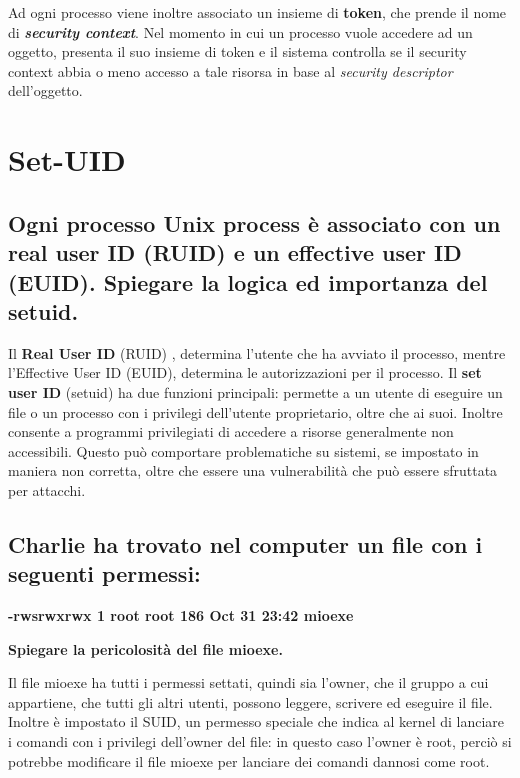 \documentclass{report}
\begin{document}
\noindent Ad ogni processo viene inoltre associato un insieme di \textbf{token}, che prende il nome di 
\textbf{\textit{security context}}. Nel momento in cui un processo vuole accedere ad un oggetto, presenta 
il suo insieme di token e il sistema controlla se il security context abbia o meno accesso a tale risorsa 
in base al \textit{security descriptor} dell'oggetto.



\chapter{Set-UID}
\section{}


\section{Ogni processo Unix process è associato con un real user ID (RUID) e un effective user ID (EUID). Spiegare la logica ed importanza del setuid.}
Il \textbf{Real User ID} (RUID) , determina l'utente che ha avviato il processo, mentre l’Effective User ID (EUID), determina le autorizzazioni per il processo.
Il \textbf{set user ID} (setuid) ha due funzioni principali: permette a un utente di eseguire un file o un processo con i privilegi dell’utente proprietario, oltre che ai suoi. Inoltre consente a programmi privilegiati di accedere a risorse generalmente non accessibili.
Questo può comportare problematiche su sistemi, se impostato in maniera non corretta, oltre che essere una vulnerabilità che può essere sfruttata per attacchi.

\section{Charlie ha trovato nel computer un file con i seguenti permessi:}
\noindent \textbf{-rwsrwxrwx 1 root root 186 Oct 31 23:42 mioexe}

\noindent \textbf{Spiegare la pericolosità del file mioexe.}

\noindent Il file mioexe ha tutti i permessi settati, quindi sia l'owner, che il gruppo a cui appartiene, che tutti gli altri utenti, possono leggere, scrivere ed eseguire il file.
Inoltre è impostato il SUID, un permesso speciale che indica al kernel di lanciare i comandi con i privilegi dell'owner del file: in questo caso l'owner è root, 
perciò si potrebbe modificare il file mioexe per lanciare dei comandi dannosi come root.
\end{document}
